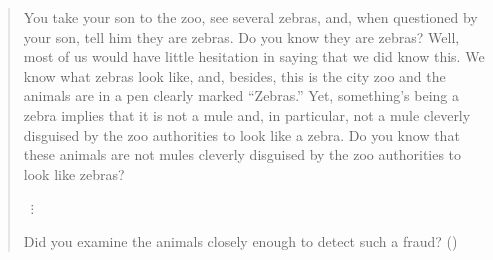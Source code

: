 \begin{note}
  \begin{illustration}
    \label{illu:CS:dretske-zebra}
    \mbox{}
    \vspace{-\baselineskip}
  \begin{quote}
    You take your son to the zoo, see several zebras, and, when questioned by your son, tell him they are zebras.
    Do you know they are zebras?
    Well, most of us would have little hesitation in saying that we did know this.
    We know what zebras look like, and, besides, this is the city zoo and the animals are in a pen clearly marked ``Zebras.''
    Yet, something's being a zebra implies that it is not a mule and, in particular, not a mule cleverly disguised by the zoo authorities to look like a zebra.
    Do you know that these animals are not mules cleverly disguised by the zoo authorities to look like zebras?

    \mbox{ }\hfill \(\vdots\) \hfill\mbox{ }

    Did you examine the animals closely enough to detect such a fraud?\linebreak
    \mbox{}\hfill\mbox{(\citeyear[1015--1016]{Dretske:1970to})}
  \end{quote}
  \vspace{-\baselineskip}
  \end{illustration}
\end{note}

